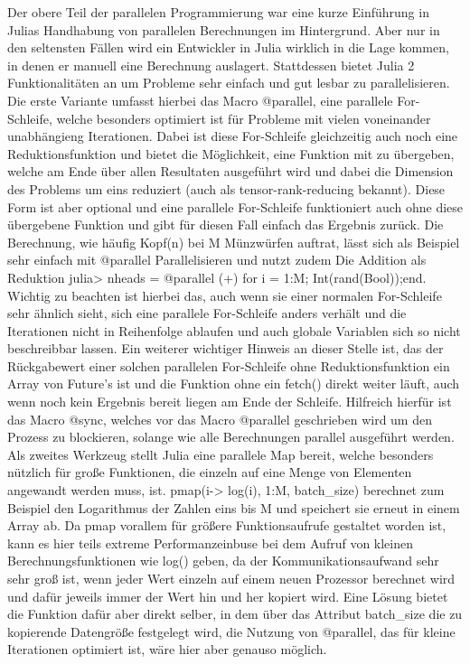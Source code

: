\documentclass[proseminar,german,utf8]{zihpub}
\begin{document}
Der obere Teil der parallelen Programmierung war eine kurze Einführung in Julias Handhabung von parallelen Berechnungen im Hintergrund. Aber nur in den seltensten Fällen wird ein Entwickler in Julia wirklich in die Lage kommen, in denen er manuell eine Berechnung auslagert. Stattdessen bietet Julia 2 Funktionalitäten an um Probleme sehr einfach und gut lesbar zu parallelisieren. Die erste Variante umfasst hierbei das Macro @parallel, eine parallele For-Schleife, welche besonders optimiert ist für Probleme mit vielen voneinander unabhängieng Iterationen. Dabei ist diese For-Schleife gleichzeitig auch noch eine Reduktionsfunktion und bietet die Möglichkeit, eine Funktion mit zu übergeben, welche am Ende über allen Resultaten ausgeführt wird und dabei die Dimension des Problems um eins reduziert (auch als tensor-rank-reducing bekannt). Diese Form ist aber optional und eine parallele For-Schleife funktioniert auch ohne diese übergebene Funktion und gibt für diesen Fall einfach das Ergebnis zurück. Die Berechnung, wie häufig Kopf(n) bei M Münzwürfen auftrat, lässt sich als Beispiel sehr einfach mit @parallel Parallelisieren und nutzt zudem Die Addition als Reduktion julia> nheads = @parallel (+) for i = 1:M; Int(rand(Bool));end. Wichtig zu beachten ist hierbei das, auch wenn sie einer normalen For-Schleife sehr ähnlich sieht, sich eine parallele For-Schleife anders verhält und die Iterationen nicht in Reihenfolge ablaufen und auch globale Variablen sich so nicht beschreibbar lassen. Ein weiterer wichtiger Hinweis an dieser Stelle ist, das der Rückgabewert einer solchen parallelen For-Schleife ohne Reduktionsfunktion ein Array von Future's ist und die Funktion ohne ein fetch() direkt weiter läuft, auch wenn noch kein Ergebnis bereit liegen am Ende der Schleife. Hilfreich hierfür ist das Macro @sync, welches vor das Macro @parallel geschrieben wird um den Prozess zu blockieren, solange wie alle Berechnungen parallel ausgeführt werden. Als zweites Werkzeug stellt Julia eine parallele Map bereit, welche besonders nützlich für große Funktionen, die einzeln auf eine Menge von Elementen angewandt werden muss, ist. pmap(i-> log(i), 1:M, batch\_size) berechnet zum Beispiel den Logarithmus der Zahlen eins bis M und speichert sie erneut in einem Array ab. Da pmap vorallem für größere Funktionsaufrufe gestaltet worden ist, kann es hier teils extreme Performanzeinbuse bei dem Aufruf von kleinen Berechnungsfunktionen wie log() geben, da der Kommunikationsaufwand sehr sehr groß ist, wenn jeder Wert einzeln auf einem neuen Prozessor berechnet wird und dafür jeweils immer der Wert hin und her kopiert wird. Eine Lösung bietet die Funktion dafür aber direkt selber, in dem über das Attribut batch\_size die zu kopierende Datengröße festgelegt wird, die Nutzung von @parallel, das für kleine Iterationen optimiert ist, wäre hier aber genauso möglich.
\end{document}

